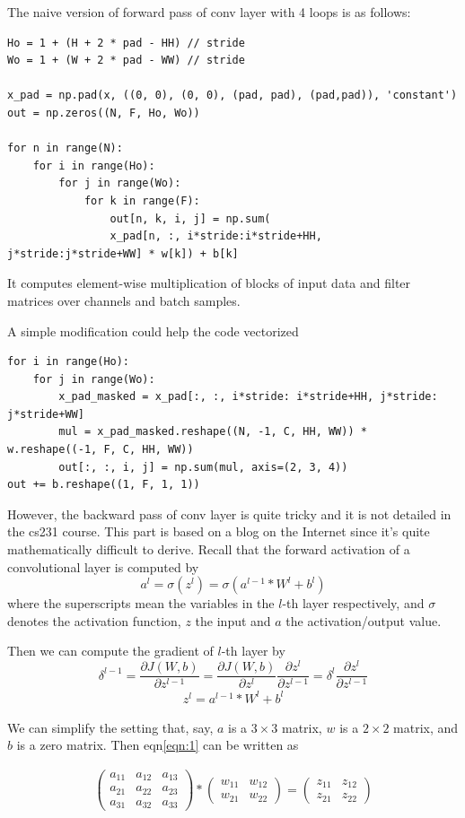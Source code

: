 \documentclass{article} %
\begin{document}
The naive version of forward pass of conv layer with 4 loops is as follows:
\begin{lstlisting}
Ho = 1 + (H + 2 * pad - HH) // stride
Wo = 1 + (W + 2 * pad - WW) // stride

x_pad = np.pad(x, ((0, 0), (0, 0), (pad, pad), (pad,pad)), 'constant')
out = np.zeros((N, F, Ho, Wo))

for n in range(N):
	for i in range(Ho):
		for j in range(Wo):
			for k in range(F):
				out[n, k, i, j] = np.sum(
				x_pad[n, :, i*stride:i*stride+HH, j*stride:j*stride+WW] * w[k]) + b[k]
\end{lstlisting}
It computes element-wise multiplication of blocks of input data and filter matrices over channels and batch samples. 

A simple modification could help the code vectorized
\begin{lstlisting}
for i in range(Ho):
	for j in range(Wo):
		x_pad_masked = x_pad[:, :, i*stride: i*stride+HH, j*stride: j*stride+WW]
		mul = x_pad_masked.reshape((N, -1, C, HH, WW)) * w.reshape((-1, F, C, HH, WW))
		out[:, :, i, j] = np.sum(mul, axis=(2, 3, 4))
out += b.reshape((1, F, 1, 1))
\end{lstlisting}

However, the backward pass of conv layer is quite tricky and it is not detailed in the cs231 course. This part is based on a blog on the Internet since it's quite mathematically difficult to derive. Recall that the forward activation of a convolutional layer is computed by
$$a^l=\sigma(z^l)=\sigma(a^{l-1}*W^l + b^l)$$
where the superscripts mean the variables in the $l$-th layer respectively, and $\sigma$ denotes the activation function, $z$ the input and $a$ the activation/output value.

Then we can compute the gradient of $l$-th layer by
$$\delta^{l-1}=\frac{\partial J(W,b)}{\partial z^{l-1}}=\frac{\partial J(W,b)}{\partial z^{l}} \frac{\partial z^l}{\partial z^{l-1}}=\delta^l \frac{\partial z^l}{\partial z^{l-1
}}$$
\begin{eqnarray}
z^l = a^{l-1}*W^l +b^l
\label{eqn:1}
\end{eqnarray}

We can simplify the setting that, say, $a$ is a $3 \times 3$ matrix, $w$ is a $2 \times 2$ matrix, and $b$ is a zero matrix. Then eqn\ref{eqn:1} can be written as

\begin{eqnarray}
\left( \begin{array}{ccc} 
	a_{11}&a_{12}&a_{13} \\ 
	a_{21}&a_{22}&a_{23}\\ 
	a_{31}&a_{32}&a_{33} 
	\end{array} \right)    
*  
\left( \begin{array}{ccc} 
	w_{11}&w_{12}\\ 
	w_{21}&w_{22} 
\end{array} \right) 
=
\left( \begin{array}{ccc} 
	z_{11}&z_{12}\\ 
	z_{21}&z_{22} 
\end{array} \right)
\label{eqn:2}
\end{eqnarray}
\end{document}
